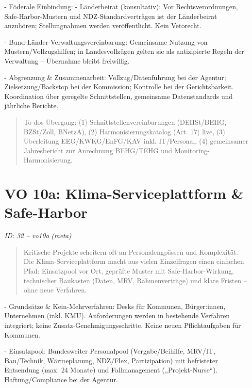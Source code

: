 \documentclass[12pt,a4paper]{scrartcl}
\begin{document}
- Föderale Einbindung:
- Länderbeirat (konsultativ): Vor Rechtsverordnungen, Safe-Harbor-Mustern und NDZ-Standardverträgen ist der Länderbeirat anzuhören; Stellungnahmen werden veröffentlicht. Kein Vetorecht.

- Bund-Länder-Verwaltungsvereinbarung: Gemeinsame Nutzung von Mustern/Vollzugshilfen; in Landesvollzügen gelten sie als antizipierte Regeln der Verwaltung -- Übernahme bleibt freiwillig.

- Abgrenzung \& Zusammenarbeit: Vollzug/Datenführung bei der Agentur; Zielsetzung/Backstop bei der Kommission; Kontrolle bei der Gerichtsbarkeit. Koordination über geregelte Schnittstellen, gemeinsame Datenstandards und jährliche Berichte.

{\footnotesize\begin{quote}
To-dos Übergang: (1) Schnittstellenvereinbarungen (DEHSt/BEHG, BZSt/Zoll, BNetzA), (2) Harmonisierungskatalog (Art. 17) live, (3) Überleitung EEG/KWKG/EnFG/KAV inkl. IT/Personal, (4) gemeinsamer Jahresbericht zur Anrechnung BEHG/TEHG und Monitoring-Harmonisierung.
\end{quote}}



\section[VO 10a: Klima-Serviceplattform \& Safe-Harbor]{VO 10a: Klima-Serviceplattform \& Safe-Harbor}
\noindent\textit{ID: 32 -- vo10a (meta)}

\begin{quote}
Kritische Projekte scheitern oft an Personalengpässen und Komplexität. Die Klima-Serviceplattform macht aus vielen Einzelfragen einen einfachen Pfad: Einsatzpool vor Ort, geprüfte Muster mit Safe-Harbor-Wirkung, technischer Baukasten (Daten, MRV, Rahmenverträge) und klare Fristen -- ohne neue Verfahren.
\end{quote}

- Grundsätze \& Kein-Mehrverfahren: Desks für Kommunen, Bürger:innen, Unternehmen (inkl. KMU). Anforderungen werden in bestehende Verfahren integriert; keine Zusatz-Genehmigungsschritte. Keine neuen Pflichtaufgaben für Kommunen.

- Einsatzpool: Bundesweiter Personalpool (Vergabe/Beihilfe, MRV/IT, Bau/Technik, Wärmeplanung, NDZ/Flex, Partizipation) mit befristeter Entsendung (max. 24 Monate) und Fallmanagement („Projekt-Nurse“). Haftung/Compliance bei der Agentur.
\end{document}
